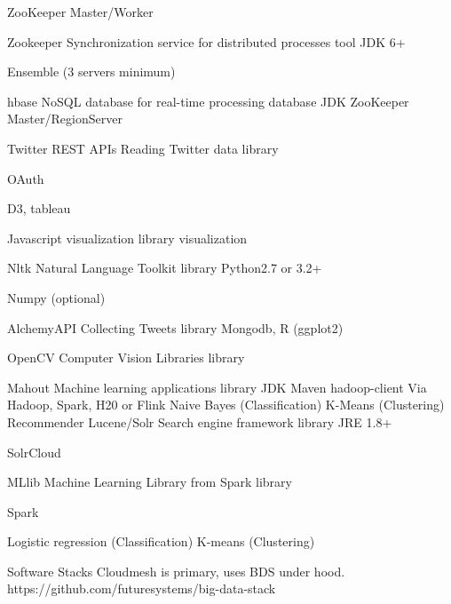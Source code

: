 \documentclass[9pt,twocolumn,twoside]{styles/osajnl}
\begin{document}
	ZooKeeper
	Master/Worker
	

	Zookeeper
	Synchronization service for distributed processes
	tool
	JDK 6+
	

	Ensemble (3 servers minimum)

	

	hbase
	NoSQL database for real-time processing
	database
	JDK
	ZooKeeper
	Master/RegionServer
	

	Twitter REST APIs
	Reading Twitter data
	library
	

	OAuth
	

	

	D3, tableau

	Javascript visualization library
	visualization
	

	

	

	

	Nltk
	Natural Language Toolkit
	library
	Python2.7 or 3.2+

	Numpy (optional)
	

	

	AlchemyAPI
	Collecting Tweets
	library
	Mongodb, R (ggplot2)
	

	

	

	OpenCV
	Computer Vision Libraries
	library
	

	

	

	

	Mahout
	Machine learning applications
	library
	JDK
Maven
	hadoop-client
	Via Hadoop, Spark, H20 or Flink
	Naive Bayes (Classification)
K-Means (Clustering)
Recommender
	Lucene/Solr
	Search engine framework
	library
	JRE 1.8+
	

	SolrCloud
	

	MLlib
	Machine Learning Library from Spark
	library
	

	Spark
	

	Logistic regression (Classification)
K-means (Clustering)
	

	

	

	

	

	

	

	





Software Stacks
Cloudmesh is primary, uses BDS under hood.
https://github.com/futuresystems/big-data-stack
\end{document}
